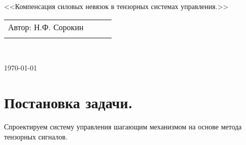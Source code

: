 \documentclass[a4paper]{article}
\begin{document}
\begin{center}
\hfill \break
\hfill\break
\hfill \break
\hfill \break
\hfill \break
\hfill \break
\hfill \break
\hfill \break
\hfill \break
\hfill \break
\large{<<Компенсация силовых невязок в тензорных системах управления.>>}\\
\hfill \break
\hfill \break
\hfill \break
\hfill \break
\hfill \break
\hfill \break
\hfill \break
\hfill \break
\end{center}
 
\normalsize{ 
\begin{tabular}{lccl}
Автор: Н.Ф. Сорокин\\\\
\end{tabular}
}\\
\hfill \break
\hfill \break
\hfill \break
\hfill \break
\hfill \break
\begin{center} \today \end{center}
\thispagestyle{empty} %
\newpage

\section{Постановка задачи.}
Спроектируем систему управления шагающим механизмом на основе метода тензорных сигналов.
\end{document}
